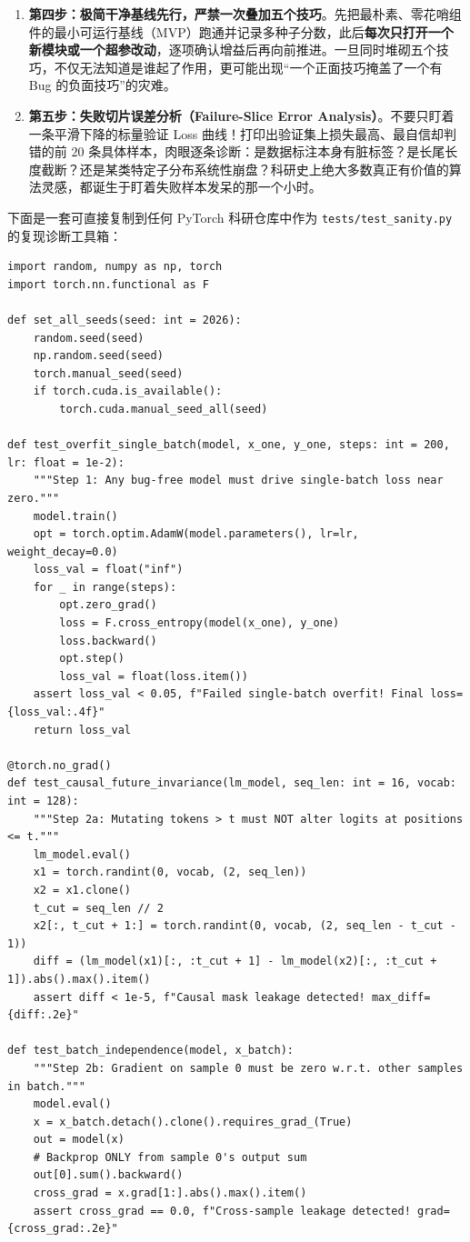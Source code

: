 \begin{enumerate}
  \item \textbf{第四步：极简干净基线先行，严禁一次叠加五个技巧}。先把最朴素、零花哨组件的最小可运行基线（MVP）跑通并记录多种子分数，此后\textbf{每次只打开一个新模块或一个超参改动}，逐项确认增益后再向前推进。一旦同时堆砌五个技巧，不仅无法知道是谁起了作用，更可能出现“一个正面技巧掩盖了一个有 Bug 的负面技巧”的灾难。
  \item \textbf{第五步：失败切片误差分析（Failure-Slice Error Analysis）}。不要只盯着一条平滑下降的标量验证 Loss 曲线！打印出验证集上损失最高、最自信却判错的前 $20$ 条具体样本，肉眼逐条诊断：是数据标注本身有脏标签？是长尾长度截断？还是某类特定子分布系统性崩盘？科研史上绝大多数真正有价值的算法灵感，都诞生于盯着失败样本发呆的那一个小时。
\end{enumerate}

下面是一套可直接复制到任何 PyTorch 科研仓库中作为 \texttt{tests/test\_sanity.py} 的复现诊断工具箱：

\begin{lstlisting}[caption={PyTorch 零 Bug 复现核心自检套件：单批过拟合、因果不变性与批次独立性}]
import random, numpy as np, torch
import torch.nn.functional as F

def set_all_seeds(seed: int = 2026):
    random.seed(seed)
    np.random.seed(seed)
    torch.manual_seed(seed)
    if torch.cuda.is_available():
        torch.cuda.manual_seed_all(seed)

def test_overfit_single_batch(model, x_one, y_one, steps: int = 200, lr: float = 1e-2):
    """Step 1: Any bug-free model must drive single-batch loss near zero."""
    model.train()
    opt = torch.optim.AdamW(model.parameters(), lr=lr, weight_decay=0.0)
    loss_val = float("inf")
    for _ in range(steps):
        opt.zero_grad()
        loss = F.cross_entropy(model(x_one), y_one)
        loss.backward()
        opt.step()
        loss_val = float(loss.item())
    assert loss_val < 0.05, f"Failed single-batch overfit! Final loss={loss_val:.4f}"
    return loss_val

@torch.no_grad()
def test_causal_future_invariance(lm_model, seq_len: int = 16, vocab: int = 128):
    """Step 2a: Mutating tokens > t must NOT alter logits at positions <= t."""
    lm_model.eval()
    x1 = torch.randint(0, vocab, (2, seq_len))
    x2 = x1.clone()
    t_cut = seq_len // 2
    x2[:, t_cut + 1:] = torch.randint(0, vocab, (2, seq_len - t_cut - 1))
    diff = (lm_model(x1)[:, :t_cut + 1] - lm_model(x2)[:, :t_cut + 1]).abs().max().item()
    assert diff < 1e-5, f"Causal mask leakage detected! max_diff={diff:.2e}"

def test_batch_independence(model, x_batch):
    """Step 2b: Gradient on sample 0 must be zero w.r.t. other samples in batch."""
    model.eval()
    x = x_batch.detach().clone().requires_grad_(True)
    out = model(x)
    # Backprop ONLY from sample 0's output sum
    out[0].sum().backward()
    cross_grad = x.grad[1:].abs().max().item()
    assert cross_grad == 0.0, f"Cross-sample leakage detected! grad={cross_grad:.2e}"
\end{lstlisting}

